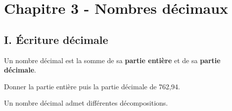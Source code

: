 
\section*{Chapitre 3 - Nombres décimaux}

\subsection*{I. Écriture décimale}


\begin{Définition}
Un nombre décimal est la somme de sa \textbf{partie entière} et de sa \textbf{partie décimale}.
\end{Définition}

\begin{Exemple}
Donner la partie entière puis la partie décimale de 762,94.

\ligne

\end{Exemple}


\begin{Propriété}
Un nombre décimal admet différentes décompositions.
\end{Propriété}

